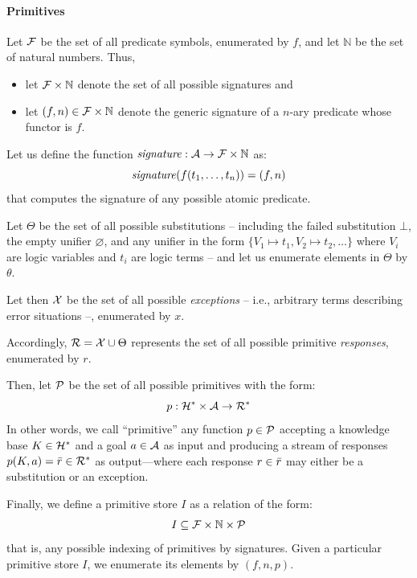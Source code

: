 \documentclass[12pt,a4paper,openright,twoside]{book}
\begin{document}
\paragraph{Primitives}

Let $\mathcal{F}$ be the set of all predicate symbols, enumerated by $f$, and let $\mathbb{N}$ be the set of natural numbers.
%
Thus,
\begin{itemize}
    \item let $\mathcal{F} \times \mathbb{N}$ denote the set of all possible signatures and
    \item let $(f,n) \in \mathcal{F} \times \mathbb{N}$ denote the generic signature of a $n$-ary predicate whose functor is $f$.
\end{itemize}
%
Let us define the function $ \mathit{signature} : \mathcal{A} \rightarrow \mathcal{F} \times \mathbb{N} $ as:
%
\[ \mathit{signature}(f(t_1, \ldots, t_n)) = (f,n) \]
%
that computes the signature of any possible atomic predicate.


Let $\Theta$ be the set of all possible substitutions -- including the failed substitution $\bot$, the empty unifier $\varnothing$, and any unifier in the form $\{V_1 \mapsto t_1, V_2 \mapsto t_2, \ldots\}$ where $V_i$ are logic variables and $t_i$ are logic terms -- and let us enumerate elements in $\Theta$ by $\theta$.

Let then $\mathcal{X}$ be the set of all possible \emph{exceptions} -- i.e., arbitrary terms describing error situations --, enumerated by $x$.

Accordingly, $\mathcal{R} = \mathcal{X} \cup \Theta$ represents the set of all possible primitive \emph{responses}, enumerated by $r$.

Then, let $\mathcal{P}$ be the set of all possible primitives with the form:
%
\[ p : \mathcal{H}^* \times \mathcal{A} \rightarrow \mathcal{R}^* \]
%
In other words, we call ``primitive'' any function $p \in \mathcal{P}$ accepting a knowledge base $K \in \mathcal{H}^*$ and a goal $a \in \mathcal{A}$ as input and producing a stream of responses $p(K, a) = \bar{r} \in \mathcal{R}^*$ as output---where each response $r \in \bar{r}$ may either be a substitution or an exception.

Finally, we define a primitive store $I$ as a relation of the form:
%
\[ I \subseteq \mathcal{F} \times \mathbb{N} \times \mathcal{P} \]
%
that is, any possible indexing of primitives by signatures.
%
Given a particular primitive store $I$, we enumerate its elements by $(f, n, p)$.
\end{document}
